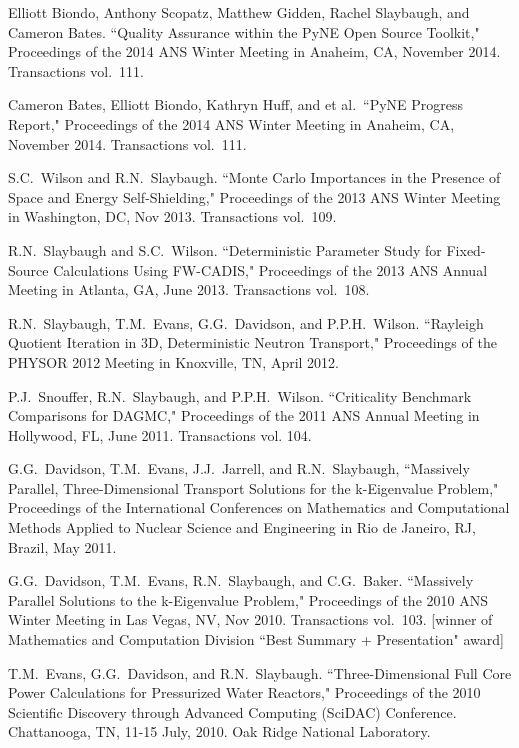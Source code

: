 \begin{bibsection}
\item Elliott Biondo, Anthony Scopatz, Matthew Gidden, Rachel Slaybaugh, and Cameron Bates. ``Quality Assurance within the PyNE Open Source Toolkit,"  Proceedings of the 2014 ANS Winter Meeting in Anaheim, CA, November 2014. Transactions vol.\ 111.

\item Cameron Bates, Elliott Biondo, Kathryn Huff, and et al.\ ``PyNE Progress Report," Proceedings of the 2014 ANS Winter Meeting in Anaheim, CA, November 2014. Transactions vol.\ 111.

\item S.C.\ Wilson and R.N.\ Slaybaugh. ``Monte Carlo Importances in the Presence of Space and Energy Self-Shielding," Proceedings of the 2013 ANS Winter Meeting in Washington, DC, Nov 2013. Transactions vol.\ 109.

\item R.N.\ Slaybaugh and  S.C.\ Wilson. ``Deterministic Parameter Study for Fixed-Source Calculations Using FW-CADIS," Proceedings of the 2013 ANS Annual Meeting in Atlanta, GA, June 2013. Transactions vol.\ 108.

\item R.N.\ Slaybaugh, T.M.\ Evans, G.G.\ Davidson, and P.P.H.\ Wilson. ``Rayleigh Quotient Iteration in 3D, Deterministic Neutron Transport," Proceedings of the PHYSOR 2012 Meeting in Knoxville, TN, April 2012.

\item P.J.\ Snouffer, R.N.\ Slaybaugh, and P.P.H.\ Wilson. ``Criticality Benchmark Comparisons for DAGMC," Proceedings of the 2011 ANS Annual Meeting in Hollywood, FL, June 2011. Transactions vol. 104.

\item G.G.\ Davidson, T.M.\ Evans, J.J.\ Jarrell, and R.N.\ Slaybaugh, ``Massively Parallel, Three-Dimensional Transport Solutions for the k-Eigenvalue Problem," Proceedings of the International Conferences on Mathematics and Computational Methods Applied to Nuclear Science and Engineering in Rio de Janeiro, RJ, Brazil, May 2011.

\item G.G.\ Davidson, T.M.\ Evans, R.N.\ Slaybaugh, and C.G.\ Baker.  ``Massively Parallel Solutions to the k-Eigenvalue Problem," Proceedings of the 2010 ANS Winter Meeting in Las Vegas, NV, Nov 2010. Transactions vol.\ 103. [winner of Mathematics and Computation Division ``Best Summary + Presentation" award]

\item T.M.\ Evans, G.G.\ Davidson, and R.N.\ Slaybaugh.  ``Three-Dimensional Full Core Power Calculations for Pressurized Water Reactors," Proceedings of the 2010 Scientific Discovery through Advanced Computing (SciDAC) Conference. Chattanooga, TN, 11-15 July, 2010. Oak Ridge National Laboratory.


\end{bibsection}
